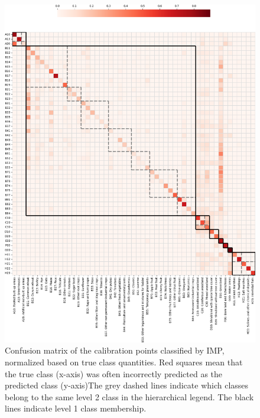     \begin{figure}
        \centering
        \includegraphics[width=\textwidth]{figs_05/fig_hierarchical_confusion_matrix_calib.png}
        \caption{Confusion matrix of the calibration points classified by IMP, normalized based on true class quantities. Red squares mean that the true class (x-axis) was often incorrectly predicted as the predicted class (y-axis)The grey dashed lines indicate which classes belong to the same level 2 class in the hierarchical legend. The black lines indicate level 1 class membership.}
        \label{fig:05_confusion_matrix}
    \end{figure}


